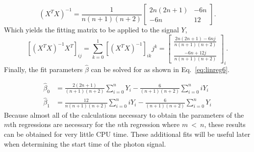 \documentclass[oneside,12pt]{memoir}
\begin{document}
\begin{equation}
	\label{eq:linreg4}
	\left(X^T X\right)^{-1}=\frac{1}{n\left(n+1\right)\left(n+2\right)}
	\begin{bmatrix}
		2n\left(2n+1\right) & -6n \\
		-6n & 12
	\end{bmatrix}.
\end{equation}
Which yields the fitting matrix to be applied to the signal $Y$,
\begin{equation}
	\label{eq:linreg5}
	\left[\left(X^T X\right)^{-1} X^T\right]_{ij}
	=\sum_{k=0}^1\left[\left(X^T X\right)^{-1}\right]_{ik}j^k=
	\begin{bmatrix}
		\frac{2n\left(2n+1\right)-6nj}
			{n\left(n+1\right)\left(n+2\right)} \\
		\frac{-6n+12j}{n\left(n+1\right)\left(n+2\right)}
	\end{bmatrix}_i.
\end{equation}
Finally, the fit parameters $\hat\beta$ can be solved for as shown in Eq.~\ref{eq:linreg6}.\par
\begin{subequations}
	\label{eq:linreg6}
	\begin{align}
		\label{eq:linreg6a}
		\hat\beta_0&=\frac{2\left(2n+1\right)}
			{\left(n+1\right)\left(n+2\right)}\sum_{i=0}^n {Y_i}
			-\frac{6}{\left(n+1\right)\left(n+2\right)}\sum_{i=0}^n{iY_i}\\
		\label{eq:linreg6b}
		\hat\beta_1&=\frac{12}{n\left(n+1\right)\left(n+2\right)}\sum_{i=0}^n {iY_i}
			-\frac{6}{\left(n+1\right)\left(n+2\right)}\sum_{i=0}^n {Y_i}
	\end{align}
\end{subequations}
Because almost all of the calculations necessary to obtain the parameters of the $m$th regressions are necessary for the $n$th regression where $m~<~n$, these results can be obtained for very little CPU time. These additional fits will be useful later when determining the start time of the photon signal.\par
\end{document}
